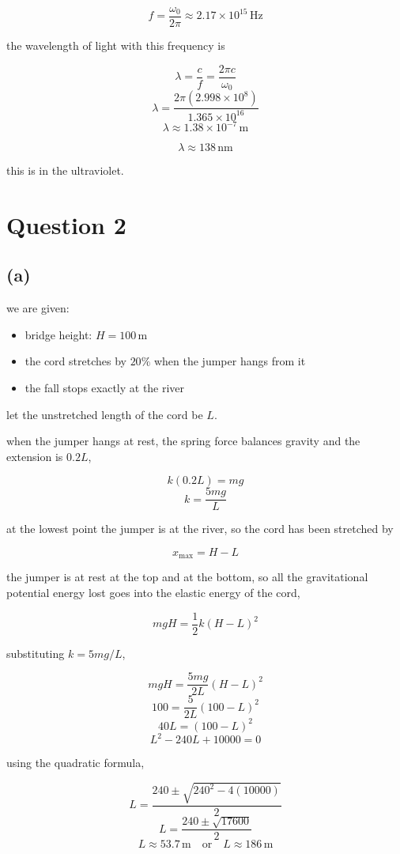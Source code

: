 \documentclass{article}
\begin{document}
\[
f=\frac{\omega_0}{2\pi}\approx2.17\times10^{15}\,\mathrm{Hz}
\]

the wavelength of light with this frequency is

\[
\lambda=\frac{c}{f}=\frac{2\pi c}{\omega_0}
\]
\[
\lambda=\frac{2\pi(2.998\times10^{8})}{1.365\times10^{16}}
\]
\[
\lambda\approx1.38\times10^{-7}\,\mathrm{m}
\]

\[
\boxed{\lambda\approx138\,\mathrm{nm}}
\]

this is in the ultraviolet.

\section*{Question 2}

\subsection*{(a)}

we are given:

\begin{itemize}
    \item bridge height: $H=100\,\mathrm{m}$
    \item the cord stretches by $20\%$ when the jumper hangs from it
    \item the fall stops exactly at the river
\end{itemize}

let the unstretched length of the cord be $L$.

when the jumper hangs at rest, the spring force balances gravity and the extension is $0.2L$,

\[
k(0.2L)=mg
\]
\[
k=\frac{5mg}{L}
\]

at the lowest point the jumper is at the river, so the cord has been stretched by

\[
x_{\max}=H-L
\]

the jumper is at rest at the top and at the bottom, so all the gravitational potential energy lost goes into the elastic energy of the cord,

\[
mgH=\frac{1}{2}k(H-L)^2
\]

substituting $k=5mg/L$,

\[
mgH=\frac{5mg}{2L}(H-L)^2
\]
\[
100=\frac{5}{2L}(100-L)^2
\]
\[
40L=(100-L)^2
\]
\[
L^2-240L+10000=0
\]

using the quadratic formula,

\[
L=\frac{240\pm\sqrt{240^2-4(10000)}}{2}
\]
\[
L=\frac{240\pm\sqrt{17600}}{2}
\]
\[
L\approx53.7\,\mathrm{m}\quad\text{or}\quad L\approx186\,\mathrm{m}
\]
\end{document}

